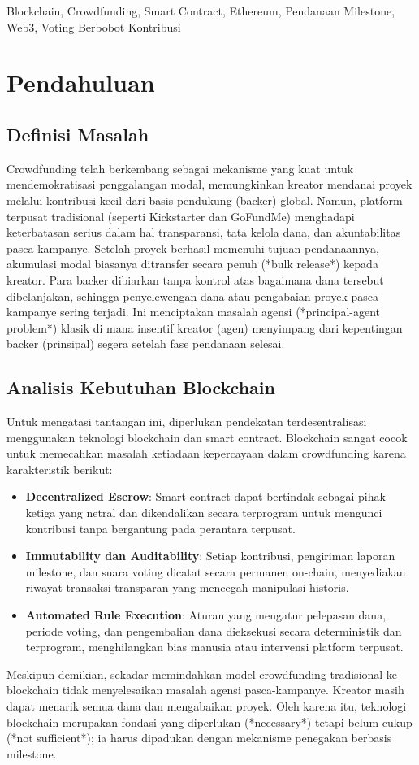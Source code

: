 \documentclass[conference]{IEEEtran}
\begin{document}
\begin{IEEEkeywords}
Blockchain, Crowdfunding, Smart Contract, Ethereum, Pendanaan Milestone, Web3, Voting Berbobot Kontribusi
\end{IEEEkeywords}

\section{Pendahuluan}

\subsection{Definisi Masalah}
Crowdfunding telah berkembang sebagai mekanisme yang kuat untuk mendemokratisasi penggalangan modal, memungkinkan kreator mendanai proyek melalui kontribusi kecil dari basis pendukung (backer) global. Namun, platform terpusat tradisional (seperti Kickstarter dan GoFundMe) menghadapi keterbatasan serius dalam hal transparansi, tata kelola dana, dan akuntabilitas pasca-kampanye. Setelah proyek berhasil memenuhi tujuan pendanaannya, akumulasi modal biasanya ditransfer secara penuh (*bulk release*) kepada kreator. Para backer dibiarkan tanpa kontrol atas bagaimana dana tersebut dibelanjakan, sehingga penyelewengan dana atau pengabaian proyek pasca-kampanye sering terjadi. Ini menciptakan masalah agensi (*principal-agent problem*) klasik di mana insentif kreator (agen) menyimpang dari kepentingan backer (prinsipal) segera setelah fase pendanaan selesai.

\subsection{Analisis Kebutuhan Blockchain}
Untuk mengatasi tantangan ini, diperlukan pendekatan terdesentralisasi menggunakan teknologi blockchain dan smart contract. Blockchain sangat cocok untuk memecahkan masalah ketiadaan kepercayaan dalam crowdfunding karena karakteristik berikut:
\begin{itemize}
	\item \textbf{Decentralized Escrow}: Smart contract dapat bertindak sebagai pihak ketiga yang netral dan dikendalikan secara terprogram untuk mengunci kontribusi tanpa bergantung pada perantara terpusat.
	\item \textbf{Immutability dan Auditability}: Setiap kontribusi, pengiriman laporan milestone, dan suara voting dicatat secara permanen on-chain, menyediakan riwayat transaksi transparan yang mencegah manipulasi historis.
	\item \textbf{Automated Rule Execution}: Aturan yang mengatur pelepasan dana, periode voting, dan pengembalian dana dieksekusi secara deterministik dan terprogram, menghilangkan bias manusia atau intervensi platform terpusat.
\end{itemize}
Meskipun demikian, sekadar memindahkan model crowdfunding tradisional ke blockchain tidak menyelesaikan masalah agensi pasca-kampanye. Kreator masih dapat menarik semua dana dan mengabaikan proyek. Oleh karena itu, teknologi blockchain merupakan fondasi yang diperlukan (*necessary*) tetapi belum cukup (*not sufficient*); ia harus dipadukan dengan mekanisme penegakan berbasis milestone.
\end{document}
